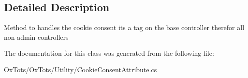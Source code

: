 \subsection{Detailed Description}
Method to handles the cookie consent it\textquotesingle{}s a tag on the base controller therefor all non-\/admin controllers 



The documentation for this class was generated from the following file\+:\begin{DoxyCompactItemize}
\item 
Ox\+Tots/\+Ox\+Tots/\+Utility/Cookie\+Consent\+Attribute.\+cs\end{DoxyCompactItemize}
